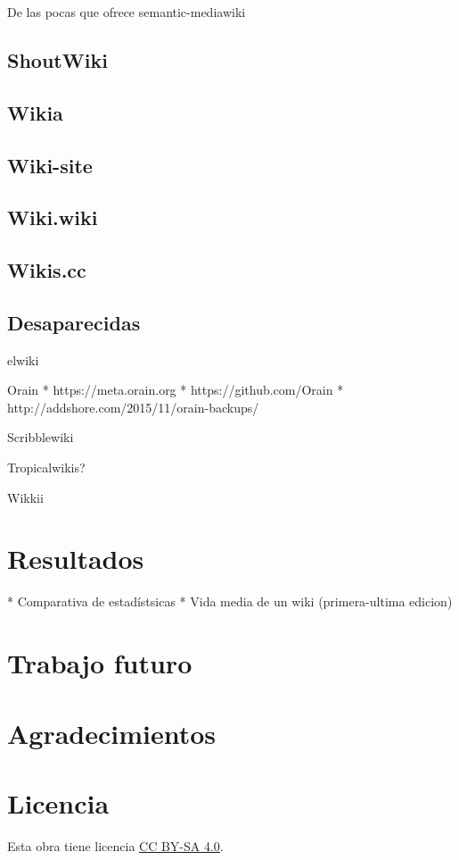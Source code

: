\documentclass[14pt,twocolumn]{article}
\begin{document}
De las pocas que ofrece semantic-mediawiki

\subsection{ShoutWiki}


\subsection{Wikia}

\subsection{Wiki-site}

\subsection{Wiki.wiki}

\subsection{Wikis.cc}

\subsection{Desaparecidas}

elwiki

Orain
* https://meta.orain.org
* https://github.com/Orain
* http://addshore.com/2015/11/orain-backups/

Scribblewiki

Tropicalwikis?

Wikkii

\section{Resultados}

* Comparativa de estadístsicas
* Vida media de un wiki (primera-ultima edicion)

\section{Trabajo futuro}




\section*{Agradecimientos}



\section*{Licencia}
Esta obra tiene licencia \href{http://creativecommons.org/licenses/by-sa/4.0/}{CC BY-SA 4.0}.



\end{document}
